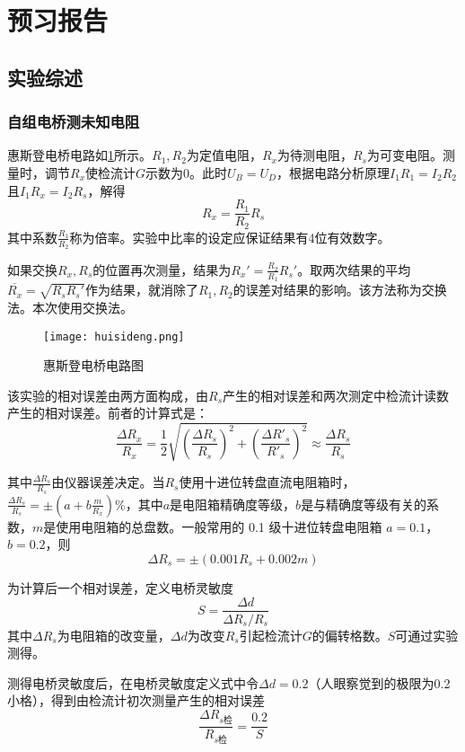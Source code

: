 \documentclass[]{../template/Report}%
\begin{document}
\maketitle

\section{预习报告}
\subsection{实验综述}

\subsubsection{自组电桥测未知电阻}
惠斯登电桥电路如\cref{huisideng}所示。$R_1,R_2$为定值电阻，$R_x$为待测电阻，$R_s$为可变电阻。测量时，调节$R_x$使检流计$G$示数为$0$。此时$U_B=U_D$，根据电路分析原理$I_1R_1=I_2R_2$且$I_1R_x=I_2R_s$，解得
\[
    R_x = \frac{R_1}{R_2} R_s
\]
其中系数$\frac{R_1}{R_2}$称为倍率。实验中比率的设定应保证结果有4位有效数字。

如果交换$R_x,R_s$的位置再次测量，结果为$R_x'=\frac{R_2}{R_1}R_s'$。取两次结果的平均$\overline{R_x} = \sqrt{R_sR_s'}$作为结果，就消除了$R_1,R_2$的误差对结果的影响。该方法称为交换法。本次使用交换法。
\begin{figure}[H]
    \centering
    \texttt{[image: huisideng.png]}
    \caption{惠斯登电桥电路图}
    \label{huisideng}
\end{figure}


该实验的相对误差由两方面构成，由$R_s$产生的相对误差和两次测定中检流计读数产生的相对误差。前者的计算式是：
\[\frac{\Delta R_x}{R_x} = \frac{1}{2} \sqrt{\left(\frac{\Delta R_s}{R_s}\right)^2 + \left(\frac{\Delta R'_s}{R'_s}\right)^2} \approx \frac{\Delta R_s}{R_s}\]

其中$\frac{\Delta R_s}{R_s}$由仪器误差决定。当$R_s$使用十进位转盘直流电阻箱时，$\frac{\Delta R_s}{R_s} = \pm \left(a+b\frac{m}{R_x}\right)\%$，其中$a$是电阻箱精确度等级，$b$是与精确度等级有关的系数，$m$是使用电阻箱的总盘数。一般常用的 0.1 级十进位转盘电阻箱 $a=0.1$，$b=0.2$，则
\[\Delta R_s = \pm (0.001 R_s + 0.002 m)\]

为计算后一个相对误差，定义电桥灵敏度
\[S = \frac{\Delta d}{\Delta R_s /R_s}\]
其中$\Delta R_s$为电阻箱的改变量，$\Delta d$为改变$R_s$引起检流计$G$的偏转格数。$S$可通过实验测得。

测得电桥灵敏度后，在电桥灵敏度定义式中令$\Delta d = 0.2$（人眼察觉到的极限为0.2小格），得到由检流计初次测量产生的相对误差
\[\frac{\Delta R_{s\text{检}}}{R_{s\text{检}}} = \frac{0.2}{S}\]
\end{document}
